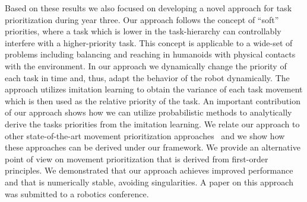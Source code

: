 Based on these results we also focused on developing a novel approach for task 
prioritization during year three. Our approach follows the concept of ``soft'' 
priorities, where a task which is lower in the task-hierarchy can controllably 
interfere with a higher-priority task. This concept is applicable to a wide-set 
of problems including balancing and reaching in humanoids with physical contacts 
with the environment. In our approach we dynamically change the priority of each 
task in time and, thus, adapt the behavior of the robot dynamically.  The 
approach utilizes imitation learning to obtain the variance of each task 
movement which is then used as the relative priority of the task. An important 
contribution of our approach shows how we can utilize probabilistic methods to 
analytically derive the tasks priorities from the imitation learning. We relate 
our approach to other state-of-the-art movement prioritization 
approaches~\cite{Peters_AR_2008, lober2015variance} and we show how these 
approaches can be derived under our framework. We provide an alternative point 
of view on movement prioritization that is derived from first-order principles. 
We demonstrated that our approach achieves improved performance and that is 
numerically stable, avoiding singularities. A paper on this approach was 
submitted to a robotics conference.

